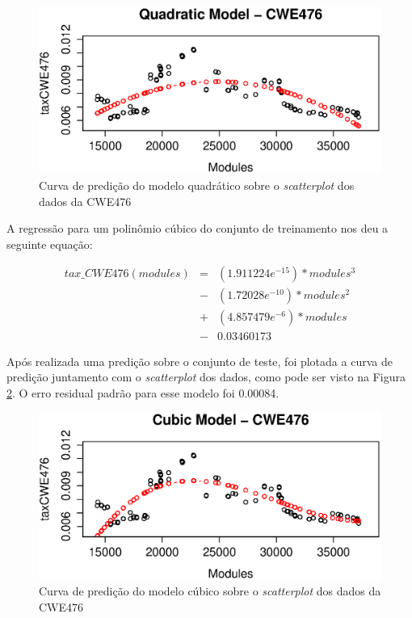 \begin{figure}[h]
  \centering
  \includegraphics[width=1.0\textwidth]
      {figuras/cwe476-quadratic.eps}
      \caption{Curva de predição do modelo quadrático sobre o \textit{scatterplot}
      dos dados da CWE476}
  \label{fig:cwe476-quadratic}
\end{figure}

A regressão para um polinômio cúbico do conjunto de treinamento nos deu a
seguinte equação:

\begin{align*}
 tax\_CWE476(modules) &=& (1.911224e^{-15}) * modules^{3} \\
                      &-& (1.72028e^{-10}) * modules^{2} \\
                      &+& (4.857479e^{-6}) * modules \\
                      &-& 0.03460173
\end{align*}

Após realizada uma predição sobre o conjunto de teste, foi plotada a curva de
predição juntamento com o \textit{scatterplot} dos dados, como pode ser visto na
Figura \ref{fig:cwe476-cubic}. O erro residual padrão para esse modelo foi
0.00084.

\begin{figure}[h]
  \centering
  \includegraphics[width=1.0\textwidth]
      {figuras/cwe476-cubic.eps}
      \caption{Curva de predição do modelo cúbico sobre o \textit{scatterplot}
      dos dados da CWE476}
  \label{fig:cwe476-cubic}
\end{figure}


